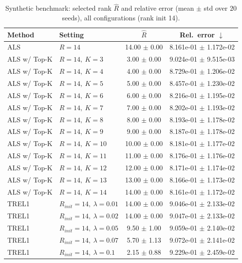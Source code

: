\begin{table}[t]
\centering
\caption{Synthetic benchmark: selected rank \(\hat R\) and relative error (mean \(\pm\) std over \(20\) seeds), all configurations (rank init 14).}
\label{tab:results_synth_all}
\begin{tabular}{@{}llcc@{}}
\toprule
Method & Setting & \(\hat R\) & Rel.\ error \(\downarrow\) \\ \midrule
ALS & \(R=14\) & 14.00 $\pm$ 0.00 & 8.161e-01 $\pm$ 1.172e-02 \\
ALS w/ Top-K & \(R=14,\ K=3\) & 3.00 $\pm$ 0.00 & 9.024e-01 $\pm$ 9.515e-03 \\
ALS w/ Top-K & \(R=14,\ K=4\) & 4.00 $\pm$ 0.00 & 8.729e-01 $\pm$ 1.206e-02 \\
ALS w/ Top-K & \(R=14,\ K=5\) & 5.00 $\pm$ 0.00 & 8.457e-01 $\pm$ 1.230e-02 \\
ALS w/ Top-K & \(R=14,\ K=6\) & 6.00 $\pm$ 0.00 & 8.216e-01 $\pm$ 1.195e-02 \\
ALS w/ Top-K & \(R=14,\ K=7\) & 7.00 $\pm$ 0.00 & 8.202e-01 $\pm$ 1.193e-02 \\
ALS w/ Top-K & \(R=14,\ K=8\) & 8.00 $\pm$ 0.00 & 8.193e-01 $\pm$ 1.178e-02 \\
ALS w/ Top-K & \(R=14,\ K=9\) & 9.00 $\pm$ 0.00 & 8.187e-01 $\pm$ 1.178e-02 \\
ALS w/ Top-K & \(R=14,\ K=10\) & 10.00 $\pm$ 0.00 & 8.181e-01 $\pm$ 1.177e-02 \\
ALS w/ Top-K & \(R=14,\ K=11\) & 11.00 $\pm$ 0.00 & 8.176e-01 $\pm$ 1.176e-02 \\
ALS w/ Top-K & \(R=14,\ K=12\) & 12.00 $\pm$ 0.00 & 8.171e-01 $\pm$ 1.174e-02 \\
ALS w/ Top-K & \(R=14,\ K=13\) & 13.00 $\pm$ 0.00 & 8.166e-01 $\pm$ 1.173e-02 \\
ALS w/ Top-K & \(R=14,\ K=14\) & 14.00 $\pm$ 0.00 & 8.161e-01 $\pm$ 1.172e-02 \\
TREL1 & \(R_{init}=14,\ \lambda=0.01\) & 14.00 $\pm$ 0.00 & 9.046e-01 $\pm$ 2.133e-02 \\
TREL1 & \(R_{init}=14,\ \lambda=0.02\) & 14.00 $\pm$ 0.00 & 9.047e-01 $\pm$ 2.133e-02 \\
TREL1 & \(R_{init}=14,\ \lambda=0.05\) & 9.50 $\pm$ 1.00 & 9.059e-01 $\pm$ 2.140e-02 \\
TREL1 & \(R_{init}=14,\ \lambda=0.07\) & 5.70 $\pm$ 1.13 & 9.072e-01 $\pm$ 2.141e-02 \\
TREL1 & \(R_{init}=14,\ \lambda=0.1\) & 2.15 $\pm$ 0.88 & 9.229e-01 $\pm$ 2.459e-02 \\

\end{tabular}
\end{table}
